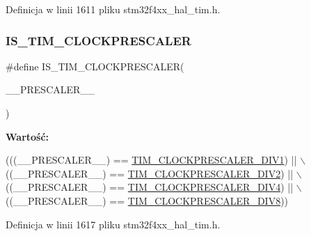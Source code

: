 Definicja w linii 1611 pliku stm32f4xx\+\_\+hal\+\_\+tim.\+h.

\mbox{\label{group___t_i_m___private___macros_gacffcfebcabdbe12264d1f09775693972}} 
\subsubsection{\texorpdfstring{I\+S\+\_\+\+T\+I\+M\+\_\+\+C\+L\+O\+C\+K\+P\+R\+E\+S\+C\+A\+L\+ER}{IS\_TIM\_CLOCKPRESCALER}}
{\footnotesize\ttfamily \#define I\+S\+\_\+\+T\+I\+M\+\_\+\+C\+L\+O\+C\+K\+P\+R\+E\+S\+C\+A\+L\+ER(\begin{DoxyParamCaption}\item[{}]{\+\_\+\+\_\+\+P\+R\+E\+S\+C\+A\+L\+E\+R\+\_\+\+\_\+ }\end{DoxyParamCaption})}

{\bfseries Wartość\+:}
\begin{DoxyCode}
(((\_\_PRESCALER\_\_) == \hyperlink{group___t_i_m___clock___prescaler_ga3462b444a059f001c6df33f55c756313}{TIM\_CLOCKPRESCALER\_DIV1}) || \(\backslash\)
                                              ((\_\_PRESCALER\_\_) == 
      \hyperlink{group___t_i_m___clock___prescaler_gac6457751c882644727982fda1fd029a5}{TIM\_CLOCKPRESCALER\_DIV2}) || \(\backslash\)
                                              ((\_\_PRESCALER\_\_) == 
      \hyperlink{group___t_i_m___clock___prescaler_ga11ce3686a0ee934384d0e4651823883d}{TIM\_CLOCKPRESCALER\_DIV4}) || \(\backslash\)
                                              ((\_\_PRESCALER\_\_) == 
      \hyperlink{group___t_i_m___clock___prescaler_ga86f147be5654631b21aa391a001401d5}{TIM\_CLOCKPRESCALER\_DIV8}))
\end{DoxyCode}


Definicja w linii 1617 pliku stm32f4xx\+\_\+hal\+\_\+tim.\+h.

\mbox{\label{group___t_i_m___private___macros_gaebd00b3c8dd1c689e9d04850333ba719}} 
